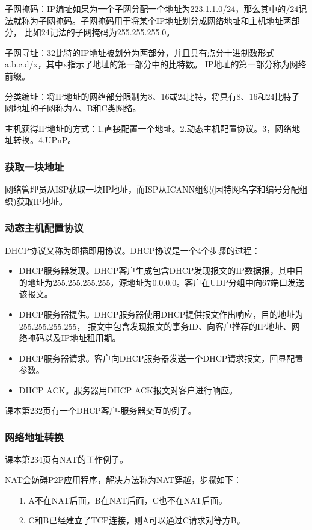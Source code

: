 \documentclass[a4paper,left=2.5cm,right=2.5cm,11pt]{article}
\begin{document}
	子网掩码：IP编址如果为一个子网分配一个地址为223.1.1.0/24，那么其中的/24记法就称为子网掩码。子网掩码用于将某个IP地址划分成网络地址和主机地址两部分，
	比如24记法的子网掩码为255.255.255.0。\par

	子网寻址：32比特的IP地址被划分为两部分，并且具有点分十进制数形式a.b.c.d/x，其中x指示了地址的第一部分中的比特数。
	IP地址的第一部分称为网络前缀。\par

	分类编址：将IP地址的网络部分限制为8、16或24比特，将具有8、16和24比特子网地址的子网称为A、B和C类网络。\par

	主机获得IP地址的方式：1.直接配置一个地址。2.动态主机配置协议。3，网络地址转换。4.UPnP。

\subsubsection{获取一块地址}
	网络管理员从ISP获取一块IP地址，而ISP从ICANN组织(因特网名字和编号分配组织)获取IP地址。

\subsubsection{动态主机配置协议}
	DHCP协议又称为即插即用协议。DHCP协议是一个4个步骤的过程：
	\begin{itemize}
		\item DHCP服务器发现。DHCP客户生成包含DHCP发现报文的IP数据报，其中目的地址为255.255.255.255，源地址为0.0.0.0。客户在UDP分组中向67端口发送该报文。
		\item DHCP服务器提供。DHCP服务器使用DHCP提供报文作出响应，目的地址为255.255.255.255，
			  报文中包含发现报文的事务ID、向客户推荐的IP地址、网络掩码以及IP地址租用期。
		\item DHCP服务器请求。客户向DHCP服务器发送一个DHCP请求报文，回显配置参数。
		\item DHCP ACK。服务器用DHCP ACK报文对客户进行响应。
	\end{itemize}

	课本第232页有一个DHCP客户-服务器交互的例子。

\subsubsection{网络地址转换}
	课本第234页有NAT的工作例子。\par

	NAT会妨碍P2P应用程序，解决方法称为NAT穿越，步骤如下：
	\begin{itemize}
		\item[1.] A不在NAT后面，B在NAT后面，C也不在NAT后面。
		\item[2.] C和B已经建立了TCP连接，则A可以通过C请求对等方B。
	\end{itemize}
\end{document}
